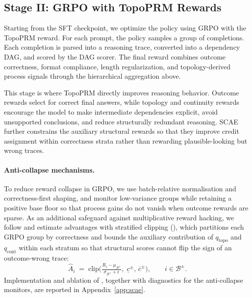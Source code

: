 
\subsection{Stage II: GRPO with TopoPRM Rewards}

Starting from the SFT checkpoint, we optimize the policy using GRPO with the TopoPRM reward. For each prompt, the policy samples a group of completions. Each completion is parsed into a reasoning trace, converted into a dependency DAG, and scored by the DAG scorer. The final reward combines outcome correctness, format compliance, length regularization, and topology-derived process signals through the hierarchical aggregation above.

This stage is where TopoPRM directly improves reasoning behavior. Outcome rewards select for correct final answers, while topology and continuity rewards encourage the model to make intermediate dependencies explicit, avoid unsupported conclusions, and reduce structurally redundant reasoning. SCAE further constrains the auxiliary structural rewards so that they improve credit assignment within correctness strata rather than rewarding plausible-looking but wrong traces.

\paragraph{Anti-collapse mechanisms.}
To reduce reward collapse in GRPO, we use batch-relative normalisation and correctness-first shaping, and monitor low-variance groups while retaining a positive base floor so that process gains do not vanish when outcome rewards are sparse. As an additional safeguard against multiplicative reward hacking, we follow \citet{liu2026graph} and estimate advantages with stratified clipping (\estimation), which partitions each GRPO group by correctness and bounds the auxiliary contribution of $q_{\mathrm{topo}}$ and $q_{\mathrm{cont}}$ within each stratum so that structural scores cannot flip the sign of an outcome-wrong trace:
\begin{equation}
\label{eq:scae}
\widehat{A}_i \;=\;
\mathrm{clip}\!\Big(\tfrac{R_i-\mu_{\mathcal{B}^{\pm}}}{\sigma_{\mathcal{B}^{\pm}}+\epsilon},\,
\,\underline{c}^{\pm},\,\overline{c}^{\pm}\Big),
\qquad i\in\mathcal{B}^{\pm}.
\end{equation}
Implementation and ablation of \estimation, together with diagnostics for the anti-collapse monitors, are reported in Appendix~\ref{app:scae}.

